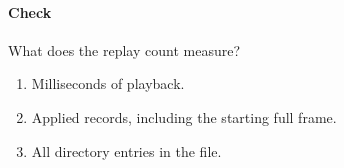 
\clearpage

\paragraph{Check} What does the replay count measure?
\begin{enumerate}[label=\Alph*.]
  \item Milliseconds of playback.
  \item Applied records, including the starting full frame.
  \item All directory entries in the file.
\end{enumerate}
